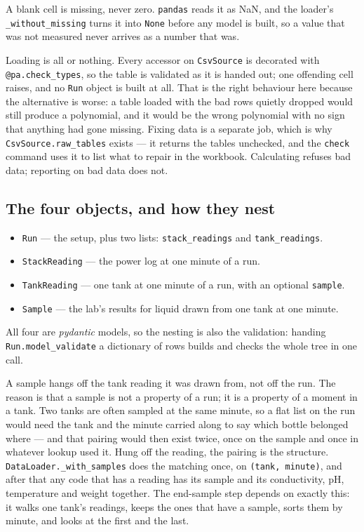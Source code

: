 A blank cell is missing, never zero. \texttt{pandas} reads it as NaN, and the loader's
\texttt{\_without\_missing} turns it into \texttt{None} before any model is built, so a value
that was not measured never arrives as a number that was.

Loading is all or nothing. Every accessor on \texttt{CsvSource} is decorated with
\texttt{@pa.check\_types}, so the table is validated as it is handed out; one offending cell
raises, and no \texttt{Run} object is built at all. That is the right behaviour here because the
alternative is worse: a table loaded with the bad rows quietly dropped would still produce a
polynomial, and it would be the wrong polynomial with no sign that anything had gone missing.
Fixing data is a separate job, which is why \texttt{CsvSource.raw\_tables} exists --- it returns
the tables unchecked, and the \texttt{check} command uses it to list what to repair in the
workbook. Calculating refuses bad data; reporting on bad data does not.

\subsection{The four objects, and how they nest}

\begin{itemize}[nosep]
  \item \texttt{Run} --- the setup, plus two lists: \texttt{stack\_readings} and
        \texttt{tank\_readings}.
  \item \texttt{StackReading} --- the power log at one minute of a run.
  \item \texttt{TankReading} --- one tank at one minute of a run, with an optional
        \texttt{sample}.
  \item \texttt{Sample} --- the lab's results for liquid drawn from one tank at one minute.
\end{itemize}

All four are \emph{pydantic} models, so the nesting is also the validation: handing
\texttt{Run.model\_validate} a dictionary of rows builds and checks the whole tree in one call.

A sample hangs off the tank reading it was drawn from, not off the run. The reason is that a
sample is not a property of a run; it is a property of a moment in a tank. Two tanks are often
sampled at the same minute, so a flat list on the run would need the tank and the minute carried
along to say which bottle belonged where --- and that pairing would then exist twice, once on
the sample and once in whatever lookup used it. Hung off the reading, the pairing is the
structure. \texttt{DataLoader.\_with\_samples} does the matching once, on
\texttt{(tank, minute)}, and after that any code that has a reading has its sample and its
conductivity, pH, temperature and weight together. The end-sample step depends on exactly this:
it walks one tank's readings, keeps the ones that have a sample, sorts them by minute, and looks
at the first and the last.

